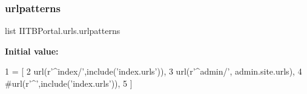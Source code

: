 \subsubsection{\texorpdfstring{urlpatterns}{urlpatterns}}
{\footnotesize\ttfamily list I\+I\+T\+B\+Portal.\+urls.\+urlpatterns}

{\bfseries Initial value\+:}
\begin{DoxyCode}
1 =  [
2     url(\textcolor{stringliteral}{r'^index/'},include(\textcolor{stringliteral}{'index.urls'})),
3     url(\textcolor{stringliteral}{r'^admin/'}, admin.site.urls),
4     \textcolor{comment}{#url(r'^',include('index.urls')),}
5 ]
\end{DoxyCode}
